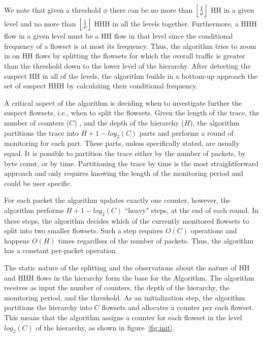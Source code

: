 We note that given a threshold $\phi$ there can be no more than $\left\lfloor \frac{1}{\phi} \right\rfloor$ HH in a given level and no more than $\left\lfloor \frac{1}{\phi} \right\rfloor$ HHH in all the levels together.
Furthermore, a HHH flow in a given level must be a HH flow in that level since the conditional frequency of a flowset is at most its frequency.
Thus, the algorithm tries to zoom in on HH flows by splitting the flowsets for which the overall traffic is greater than the threshold down to the lower level of the hierarchy. After detecting the suspect HH in all of the levels, the algorithm builds in a bottom-up approach the set of suspect HHH by calculating their conditional frequency.

A critical aspect of the algorithm is deciding when to investigate further the suspect flowsets, i.e., when to split the flowsets. Given the length of the trace, the number of counters ($C$)  , and the depth of the hierarchy ($H$), the algorithm partitions the trace into $H+1-log_2(C)$ parts and performs a round of monitoring for each part. These parts, unless specifically stated, are usually equal. It is possible to partition the trace either by the number of packets, by byte count, or by time. Partitioning the trace by time is the most straightforward approach and only requires knowing the length of the monitoring period and could be user specific.

For each packet the algorithm updates exactly one counter, however, the algorithm performs $H+1-log_2(C)$ ``heavy" steps, at the end of each round. In these steps, the algorithm decides which of the currently monitored flowsets to split into two smaller flowsets. Such a step requires $O(C)$ operations and happens $O(H)$ times regardless of the number of packets. Thus, the algorithm has a constant per-packet operation.

The static nature of the splitting and the observations about the nature of HH and HHH flows in the hierarchy form the base for the \simpleAlgo Algorithm. The algorithm receives as input the number of counters, the depth of the hierarchy, the monitoring period, and the threshold. As an initialization step, the algorithm partitions the hierarchy into $C$ flowsets and allocates a counter per each flowset. This means that the algorithm assigns a counter for each flowset in the level $log_2(C)$ of the hierarchy, as shown in figure~\ref{fig:init}.

